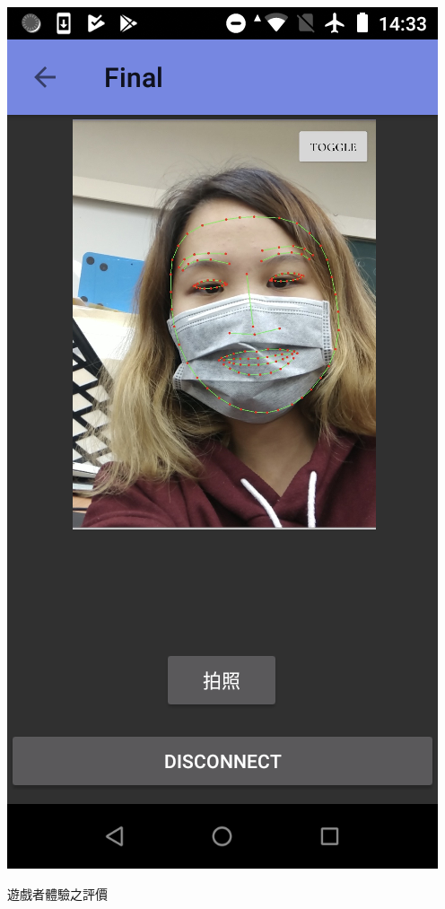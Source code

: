 \documentclass[12pt]{article}  %
\theoremstyle{plain}
\begin{document}
\begin{itemize}
\includegraphics[scale=0.265]{pic/ch4/game06.png}

\end{itemize}

遊戲者體驗之評價
\newpage
\end{document}
